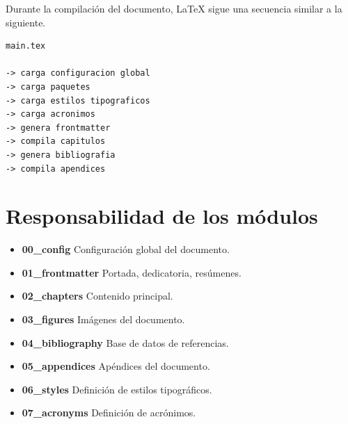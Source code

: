 Durante la compilación del documento, \LaTeX{} sigue
una secuencia similar a la siguiente.

\begin{lstlisting}[caption={Flujo de compilación del documento},label={code:compileflow}]
main.tex

-> carga configuracion global
-> carga paquetes
-> carga estilos tipograficos
-> carga acronimos
-> genera frontmatter
-> compila capitulos
-> genera bibliografia
-> compila apendices
\end{lstlisting}





\section{Responsabilidad de los módulos}

\begin{itemize}

\item \textbf{00\_config}  
Configuración global del documento.

\item \textbf{01\_frontmatter}  
Portada, dedicatoria, resúmenes.

\item \textbf{02\_chapters}  
Contenido principal.

\item \textbf{03\_figures}  
Imágenes del documento.

\item \textbf{04\_bibliography}  
Base de datos de referencias.

\item \textbf{05\_appendices}  
Apéndices del documento.

\item \textbf{06\_styles}  
Definición de estilos tipográficos.

\item \textbf{07\_acronyms}  
Definición de acrónimos.

\end{itemize}





